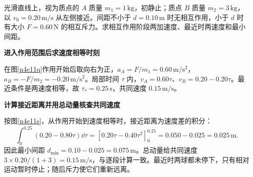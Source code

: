 \begin{question}\begin{example}[有限作用范围内的恒定斥力]\label{n4e11}
光滑直线上，视为质点的 $A$ 质量 $m_1=1\,\mathrm{kg}$，初静止；质点 $B$ 质量 $m_2=3\,\mathrm{kg}$，以 $v_0=0.20\,\mathrm{m/s}$ 从左侧接近。间距不小于 $d=0.10\,\mathrm m$ 时无相互作用，小于 $d$ 时有大小 $F=0.60\,\mathrm N$ 的相互斥力。求相互作用阶段两加速度、最近时两速度和最小间距。
\end{example}\end{question}
\begin{solution}\textbf{进入作用范围后求速度相等时刻}\par\nobreak
在图\ref{n4e11q}作用开始后取向右为正，$a_A=F/m_1=0.60\,\mathrm{m/s^2}$，$a_B=-F/m_2=-0.20\,\mathrm{m/s^2}$。局部时间 $\tau$ 内，$v_A=0.60\tau$、$v_B=0.20-0.20\tau$。最近条件是两速度相等，故 $\tau_*=0.25\,\mathrm s$，共同速度 $0.15\,\mathrm{m/s}$。


\par\medskip{}\noindent\textbf{计算接近距离并用总动量核查共同速度}\par\nobreak
按图\ref{n4e11s}，从作用开始到速度相等时，接近距离为速度差的积分：
\[
\int_0^{0.25}(0.20-0.80\tau)\dd\tau
=[0.20\tau-0.40\tau^2]_0^{0.25}
=0.050-0.025=0.025\,\mathrm m.
\]
因此最小间距 $d_{\min}=0.10-0.025=0.075\,\mathrm m$。总动量给共同速度 $3\times0.20/(1+3)=0.15\,\mathrm{m/s}$，与逐段计算一致。最近时两球都未停下，只有相对运动暂时停止；随后斥力使它们重新远离。
\end{solution}


